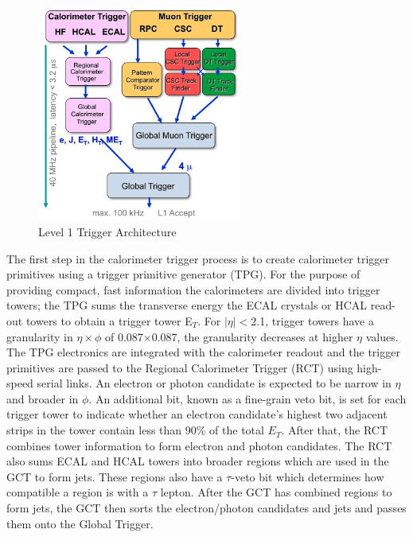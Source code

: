 \begin{figure}[t]
  \centering
	\includegraphics[trim = 0mm 0mm 0mm 0mm, clip, width=0.6\textwidth]{images/Level1TriggerArchitecture.png}
  	\caption[Level 1 Layout]
   	{Level 1 Trigger Architecture}
	\label{fig:Level1TriggerArchitecture}
\end{figure}

The first step in the calorimeter trigger process is to create
calorimeter trigger primitives using a trigger primitive generator (TPG).
For the purpose of providing compact, fast information the calorimeters
are divided into trigger towers; the TPG sums the transverse energy the
ECAL crystals or HCAL read-out towers to obtain a trigger tower E$_{T}$.
For $|\eta|<$2.1, trigger towers have a granularity
in $\eta \times \phi$ of 0.087$\times$0.087, the granularity decreases at higher
$\eta$ values. 
The TPG electronics are integrated with the calorimeter readout and the trigger primitives
are passed to the Regional Calorimeter Trigger (RCT) using
high-speed serial links.
An electron or photon candidate is expected to be narrow in $\eta$
and broader in $\phi$. An additional bit,
known as a fine-grain veto bit, is set for each trigger tower to indicate whether 
an electron candidate's  
highest two adjacent strips in the tower contain less than 90\% of the total
$E_{T}$. 
After that, the RCT combines tower information to form electron and 
photon candidates. The RCT also sums ECAL and HCAL towers into broader
regions which are used in the GCT to form jets. These regions also have a 
$\tau$-veto bit which determines how compatible a region is with a
$\tau$ lepton. After the GCT has combined regions to form jets, the GCT
then sorts the electron/photon candidates and jets and passes them onto
the Global Trigger.

